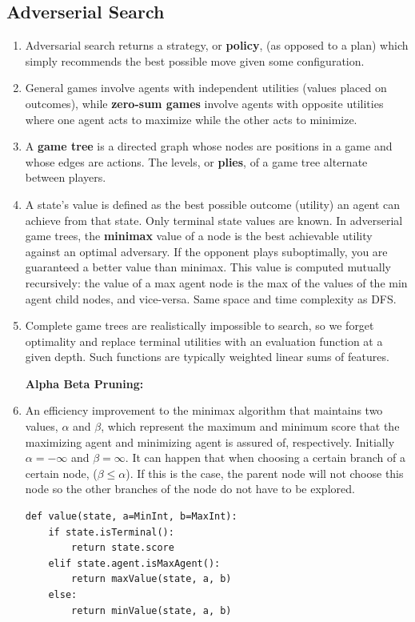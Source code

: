 \documentclass[10pt]{article}
\begin{document}
\begin{multicols}{2}
\begin{enumerate}
\begin{enumerate}
    \end{enumerate}
    
    \subsection{Adverserial Search}
    \begin{enumerate}
        \item Adversarial search returns a strategy, or \textbf{policy}, (as opposed to a plan) which simply recommends the best possible move given some configuration.
        \item General games involve agents with independent utilities (values placed on outcomes), while \textbf{zero-sum games} involve agents with opposite utilities where one agent acts to maximize while the other acts to minimize.
        \item A \textbf{game tree} is a directed graph whose nodes are positions in a game and whose edges are actions. The levels, or \textbf{plies}, of a game tree alternate between players. 
        \item A state’s value is defined as the best possible outcome (utility) an agent can achieve from that state. Only terminal state values are known. In adverserial game trees, the \textbf{minimax} value of a node is the best achievable utility against an optimal adversary. If the opponent plays suboptimally, you are guaranteed a better value than minimax. This value is computed mutually recursively: the value of a max agent node is the max of the values of the min agent child nodes, and vice-versa. Same space and time complexity as DFS. 
        \item Complete game trees are realistically impossible to search, so we forget optimality and replace terminal utilities with an evaluation function at a given depth. Such functions are typically weighted linear sums of features.
        
        \textbf{Alpha Beta Pruning:} 
         \item An efficiency improvement to the minimax algorithm that maintains two values, $\alpha$ and $\beta$, which represent the maximum and minimum score that the maximizing agent and minimizing agent is assured of, respectively. Initially $\alpha = - \infty$ and $\beta = \infty$. It can happen that when choosing a certain branch of a certain node, ($\beta \leq \alpha$). If this is the case, the parent node will not choose this node so the other branches of the node do not have to be explored.
        \begin{verbatim}
def value(state, a=MinInt, b=MaxInt):
    if state.isTerminal():
        return state.score
    elif state.agent.isMaxAgent():
        return maxValue(state, a, b)
    else:
        return minValue(state, a, b)


\end{verbatim}
\end{enumerate}
\end{enumerate}
\end{multicols}
\end{document}
